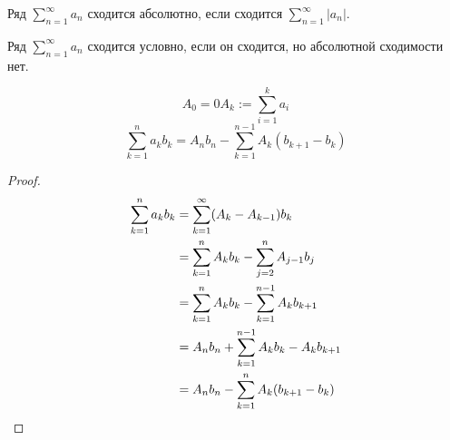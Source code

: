 \begin{definition} \thmslashn 

    Ряд $\sum\limits_{n=1}^{\infty} a_{n}$ сходится абсолютно, если сходится $\sum\limits_{n=1}^{\infty} |a_{n}|$.
\end{definition}
\begin{definition} \thmslashn 

    Ряд $\sum\limits_{n=1}^{\infty} a_{n}$ сходится условно, если он сходится, но абсолютной сходимости нет.
\end{definition}
\begin{theorem} \thmslashn

    \begin{equation*}
        A_{0} = 0
        A_{k} := \sum\limits_{i=1}^{k} a_{i}
    \end{equation*}
   \begin{equation*}
       \sum\limits_{k=1}^{n} a_{k}b_{k} = A_{n}b_{n} - \sum\limits_{k=1}^{n-1} A_{k}(b_{k+1}-b_{k})
   \end{equation*}
   \begin{proof} \thmslashn
   
       \begin{equation*}
           \begin{split}
               \sum\limits_{k=1}^{n} a_{k}b_{k} 
               &= \sum\limits_{k=1}^{\infty} (A_{k}-A_{k-1})b_{k}\\
               &= \sum\limits_{k=1}^{n} A_{k}b_{k} - \sum\limits_{j=2}^{n} A_{j-1}b_{j}\\
               &= \sum\limits_{k=1}^{n} A_{k}b_{k} - \sum\limits_{k=1}^{n-1} A_{k}b_{k+1}\\
               &= A_{n}b_{n} + \sum\limits_{k=1}^{n-1} A_{k}b_{k} - A_{k}b_{k+1}\\
               &= A_{n}b_{n} - \sum\limits_{k=1}^{n} A_{k}(b_{k+1}-b_{k}) \qedhere
           \end{split}
       \end{equation*}
   \end{proof}
\end{theorem}
